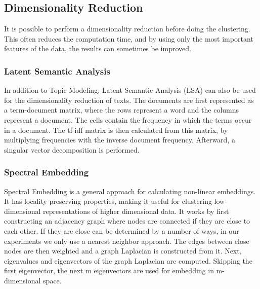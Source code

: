 \subsection{Dimensionality Reduction}
It is possible to perform a dimensionality reduction before doing the clustering.
This often reduces the computation time, and by using only the most important features of the data, the results can sometimes be improved.  

\subsubsection{Latent Semantic Analysis }
In addition to Topic Modeling, Latent Semantic Analysis (LSA) can also be used for the dimensionality reduction of texts.
The documents are first represented as a term-document matrix, where the rows represent a word and the columns represent a document.
The cells contain the frequency in which the terms occur in a document.
The tf-idf matrix is then calculated from this matrix, by multiplying frequencies with the inverse document frequency.
Afterward, a singular vector decomposition is performed.\cite{lsa}

\subsubsection{Spectral Embedding}
Spectral Embedding is a general approach for calculating non-linear embeddings. It has locality preserving properties\cite{spectral_embedding_paper}, making it useful for clustering low-dimensional representations of higher dimensional data.
It works by first constructing an adjacency graph where nodes are connected if they are close to each other. If they are close can be determined by a number of ways, in our experiments we only use a nearest neighbor approach. The edges between close nodes are then weighted and a graph Laplacian is constructed from it. Next, eigenvalues and eigenvectors of the graph Laplacian are computed. Skipping the first eigenvector, the next m eigenvectors are used for embedding in m-dimensional space.\cite{spectral_embedding_paper}

